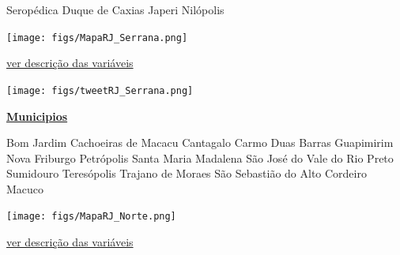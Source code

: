 \documentclass[10pt]{article} %
\begin{document}
\begin{minipage}[t]{.30\linewidth}
\begin{mdframed}[style=sidebar,frametitle={}]
\begin{itemize}
\gsquare Seropédica 
\gsquare Duque de Caxias 
\gsquare Japeri 
\gsquare Nilópolis 
\end{itemize}\BackToContents\end{mdframed}\hfill\end{minipage}\newpage\begin{minipage}[t]{.66\linewidth}
\hypertarget{Srrn}{}
\texttt{[image: figs/MapaRJ\_Serrana.png]}\vspace{0.5cm}\begin{center}

\end{center}
\small{\hyperlink{vartab}{ver descrição das variáveis}}\vspace{0.5cm}\begin{center}
\texttt{[image: figs/tweetRJ\_Serrana.png]}\end{center}
\end{minipage}\hfill\begin{minipage}[t]{.30\linewidth}
\begin{mdframed}[style=sidebar,frametitle={}]
\textbf{\hyperlink{municips}{Municipios}}\begin{itemize}\gsquare Bom Jardim 
\gsquare Cachoeiras de Macacu 
\gsquare Cantagalo 
\gsquare Carmo 
\gsquare Duas Barras 
\gsquare Guapimirim 
\gsquare Nova Friburgo 
\gsquare Petrópolis 
\gsquare Santa Maria Madalena 
\gsquare São José do Vale do Rio Preto 
\gsquare Sumidouro 
\gsquare Teresópolis 
\gsquare Trajano de Moraes 
\gsquare São Sebastião do Alto 
\gsquare Cordeiro 
\gsquare Macuco 
\end{itemize}\BackToContents\end{mdframed}\hfill\end{minipage}\newpage\begin{minipage}[t]{.66\linewidth}
\hypertarget{Nort}{}
\texttt{[image: figs/MapaRJ\_Norte.png]}\vspace{0.5cm}\begin{center}

\end{center}
\small{\hyperlink{vartab}{ver descrição das variáveis}}\vspace{0.5cm}\begin{center}

\end{center}
\end{minipage}
\end{document}

